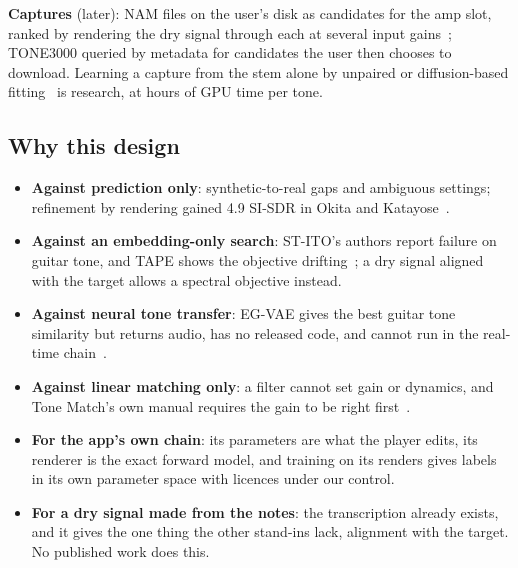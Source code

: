 \textbf{Captures} (later): NAM files on the user's disk as candidates for the amp
slot, ranked by rendering the dry signal through each at several input
gains~\cite{sd4562026nameqmatch}; TONE3000 queried by metadata for candidates the
user then chooses to download. Learning a capture from the stem alone by unpaired
or diffusion-based fitting~\cite{wright2023adversarial,moliner2025unsupervised}
is research, at hours of GPU time per tone.

\subsection{Why this design}

\begin{itemize}
\item \textbf{Against prediction only}: synthetic-to-real gaps and ambiguous
  settings; refinement by rendering gained 4.9\dB{} SI-SDR in Okita and
  Katayose~\cite{okita2026audio}.
\item \textbf{Against an embedding-only search}: ST-ITO's authors report failure
  on guitar tone, and TAPE shows the objective drifting~\cite{steinmetz2024stito,long2026tape};
  a dry signal aligned with the target allows a spectral objective instead.
\item \textbf{Against neural tone transfer}: EG-VAE gives the best guitar tone
  similarity but returns audio, has no released code, and cannot run in the
  real-time chain~\cite{yeh2026egvae}.
\item \textbf{Against linear matching only}: a filter cannot set gain or
  dynamics, and Tone Match's own manual requires the gain to be right
  first~\cite{fractalndtonematch}.
\item \textbf{For the app's own chain}: its parameters are what the player
  edits, its renderer is the exact forward model, and training on its renders
  gives labels in its own parameter space with licences under our control.
\item \textbf{For a dry signal made from the notes}: the transcription already
  exists, and it gives the one thing the other stand-ins lack, alignment with the
  target. No published work does this.
\end{itemize}
